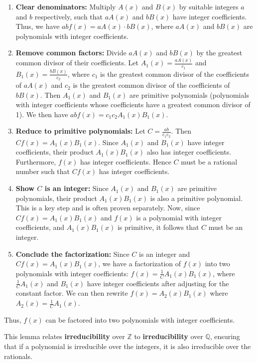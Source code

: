 \begin{enumerate}
	\item \textbf{Clear denominators:} Multiply $A(x)$ and $B(x)$ by suitable integers $a$ and $b$ respectively, such that $aA(x)$ and $bB(x)$ have integer coefficients. Thus, we have $ab f(x) = aA(x) \cdot bB(x)$, where $aA(x)$ and $bB(x)$ are polynomials with integer coefficients.
	\item \textbf{Remove common factors:} Divide $aA(x)$ and $bB(x)$ by the greatest common divisor of their coefficients. Let $A_1(x) = \frac{aA(x)}{c_1}$ and $B_1(x) = \frac{bB(x)}{c_2}$, where $c_1$ is the greatest common divisor of the coefficients of $aA(x)$ and $c_2$ is the greatest common divisor of the coefficients of $bB(x)$. Then $A_1(x)$ and $B_1(x)$ are primitive polynomials (polynomials with integer coefficients whose coefficients have a greatest common divisor of 1). We then have $ab f(x) = c_1 c_2 A_1(x) B_1(x)$.
	\item \textbf{Reduce to primitive polynomials:} Let $C = \frac{ab}{c_1 c_2}$. Then $C f(x) = A_1(x) B_1(x)$. Since $A_1(x)$ and $B_1(x)$ have integer coefficients, their product $A_1(x) B_1(x)$ also has integer coefficients. Furthermore, $f(x)$ has integer coefficients. Hence $C$ must be a rational number such that $C f(x)$ has integer coefficients.
	\item \textbf{Show $C$ is an integer:}  Since $A_1(x)$ and $B_1(x)$ are primitive polynomials, their product $A_1(x)B_1(x)$ is also a primitive polynomial. This is a key step and is often proven separately. Now, since $C f(x) = A_1(x) B_1(x)$ and $f(x)$ is a polynomial with integer coefficients, and $A_1(x)B_1(x)$ is primitive, it follows that $C$ must be an integer.
	\item \textbf{Conclude the factorization:} Since $C$ is an integer and $C f(x) = A_1(x) B_1(x)$, we have a factorization of $f(x)$ into two polynomials with integer coefficients: $f(x) = \frac{1}{C} A_1(x) B_1(x)$, where $\frac{1}{C} A_1(x)$ and $B_1(x)$ have integer coefficients after adjusting for the constant factor. We can then rewrite $f(x) = A_2(x) B_1(x)$ where $A_2(x) = \frac{1}{C}A_1(x)$.
\end{enumerate}

Thus, $f(x)$ can be factored into two polynomials with integer coefficients.

\begin{remark}
This lemma relates \textbf{irreducibility} over $\mathbb{Z}$ to \textbf{irreducibility} over $\mathbb{Q}$, ensuring that if a polynomial is irreducible over the integers, it is also irreducible over the rationals.
\end{remark}
